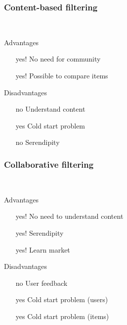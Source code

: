 \begin{frame}[t]
  \frametitle{Content-based filtering}
  \textit{}\\
  \textit{}

  Advantages\vspace{-2mm}
  \begin{itemize}
  \item [yes!] No need for community
  \item [yes!] Possible to compare items 
  \end{itemize}

  \medskip
  Disadvantages\vspace{-2mm}
  \begin{itemize}
  \item [no] Understand content
  \item [yes] Cold start problem
  \item [no] Serendipity
  \end{itemize}
\end{frame}

\begin{frame}[t]
  \frametitle{Collaborative filtering}
  \textit{}\\
  \textit{}

  Advantages\vspace{-2mm}
  \begin{itemize}
  \item [yes!] No need to understand content
  \item [yes!] Serendipity
  \item [yes!] Learn market
  \end{itemize}

  \medskip
  Disadvantages\vspace{-2mm}
  \begin{itemize}
  \item [no] User feedback
  \item [yes] Cold start problem (users)
  \item [yes] Cold start problem (items)
  \end{itemize}
\end{frame}


